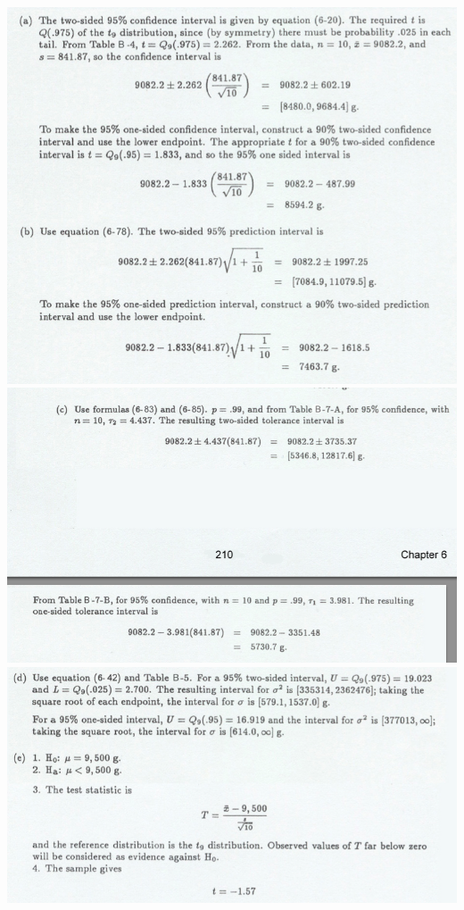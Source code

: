 \documentclass{article}\usepackage{graphicx, color}
\numberwithin{equation}{section}
\begin{document}
\begin{flushleft}
\begin{enumerate}[1. ]
 \includegraphics{../../fig/finalreviewp1sol1.png}
 \includegraphics{../../fig/finalreviewp1sol2.png}
 \includegraphics{../../fig/finalreviewp1sol3.png}

\end{enumerate}
\end{flushleft}
\end{document}
